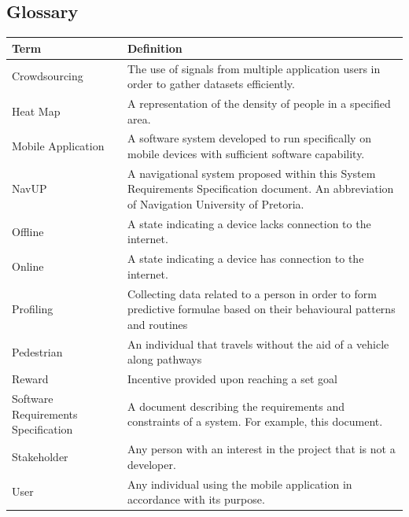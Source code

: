 \documentclass[a4paper, 12pt, one column, aas_macros]{article}
\begin{document}
\subsection{Glossary}
\begin{center}
\begin{tabular}{|m{4cm}|m{10cm}|}
	\hline
    	\textbf{Term} & \textbf{Definition}\\\hline
        Crowdsourcing & The use of signals from multiple application users in order to gather datasets efficiently.\\\hline
        Heat Map & A representation of the density of people in a specified area.\\\hline
        
        Mobile Application & A software system developed to run specifically on mobile devices with sufficient software capability.\\\hline
        
		NavUP & A navigational system proposed within this System Requirements Specification document. An abbreviation of Navigation University of Pretoria.\\\hline
        
        Offline & A state indicating a device lacks connection to the internet.\\\hline
        Online & A state indicating a device has connection to the internet.\\\hline
        
        Profiling & Collecting data related to a person in order to form predictive formulae based on their behavioural patterns and routines\\\hline
        
        Pedestrian & An individual that travels without the aid of a vehicle along pathways\\\hline
        
        Reward & Incentive provided upon reaching a set goal\\\hline
        
        Software Requirements Specification & A document describing the requirements and constraints of a system. For example, this document.\\\hline
        
        Stakeholder & Any person with an interest in the project that is not a developer.\\\hline
        User & Any individual using the mobile application in accordance with its purpose.\\
  	\hline
\end{tabular}

\end{center}
\end{document}
